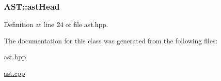 \subsubsection[{ast\+Head}]{ A\+S\+T\+::ast\+Head}\label{class_a_s_t_aaa30ec872fa91242f5c9cb7a5041b307}


Definition at line 24 of file ast.\+hpp.



The documentation for this class was generated from the following files\+:\begin{DoxyCompactItemize}
\item 
\hyperlink{ast_8hpp}{ast.\+hpp}\item 
\hyperlink{ast_8cpp}{ast.\+cpp}\end{DoxyCompactItemize}
